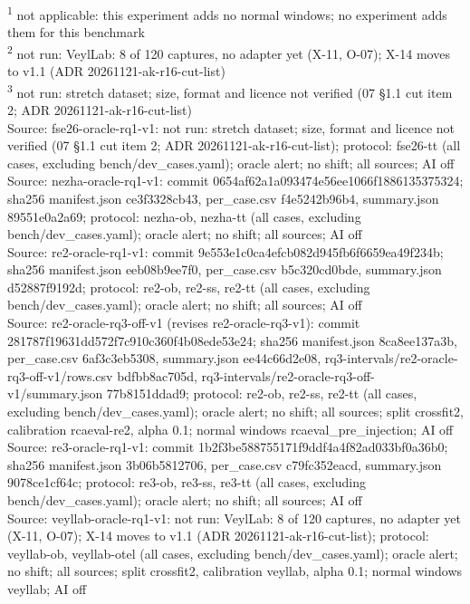 \begin{table}[t]
\begin{tabular}{llllllll}
\hline
\end{tabular}
\par\smallskip\footnotesize
\textsuperscript{1} not applicable: this experiment adds no normal windows; no experiment adds them for this benchmark\\
\textsuperscript{2} not run: VeylLab: 8 of 120 captures, no adapter yet (X-11, O-07); X-14 moves to v1.1 (ADR 20261121-ak-r16-cut-list)\\
\textsuperscript{3} not run: stretch dataset; size, format and licence not verified (07 \S{}1.1 cut item 2; ADR 20261121-ak-r16-cut-list)\\
Source: fse26-oracle-rq1-v1: not run: stretch dataset; size, format and licence not verified (07 \S{}1.1 cut item 2; ADR 20261121-ak-r16-cut-list); protocol: fse26-tt (all cases, excluding bench/dev\_cases.yaml); oracle alert; no shift; all sources; AI off\\
Source: nezha-oracle-rq1-v1: commit 0654af62a1a093474e56ee1066f1886135375324; sha256 manifest.json ce3f3328cb43, per\_case.csv f4e5242b96b4, summary.json 89551e0a2a69; protocol: nezha-ob, nezha-tt (all cases, excluding bench/dev\_cases.yaml); oracle alert; no shift; all sources; AI off\\
Source: re2-oracle-rq1-v1: commit 9e553e1c0ca4efcb082d945fb6f6659ea49f234b; sha256 manifest.json eeb08b9ee7f0, per\_case.csv b5c320cd0bde, summary.json d52887f9192d; protocol: re2-ob, re2-ss, re2-tt (all cases, excluding bench/dev\_cases.yaml); oracle alert; no shift; all sources; AI off\\
Source: re2-oracle-rq3-off-v1 (revises re2-oracle-rq3-v1): commit 281787f19631dd572f7c910c360f4b08ede53e24; sha256 manifest.json 8ca8ee137a3b, per\_case.csv 6af3c3eb5308, summary.json ee44c66d2e08, rq3-intervals/re2-oracle-rq3-off-v1/rows.csv bdfbb8ac705d, rq3-intervals/re2-oracle-rq3-off-v1/summary.json 77b8151ddad9; protocol: re2-ob, re2-ss, re2-tt (all cases, excluding bench/dev\_cases.yaml); oracle alert; no shift; all sources; split crossfit2, calibration rcaeval-re2, alpha 0.1; normal windows rcaeval\_pre\_injection; AI off\\
Source: re3-oracle-rq1-v1: commit 1b2f3be588755171f9ddf4a4f82ad033bf0a36b0; sha256 manifest.json 3b06b5812706, per\_case.csv c79fc352eacd, summary.json 9078ce1cf64c; protocol: re3-ob, re3-ss, re3-tt (all cases, excluding bench/dev\_cases.yaml); oracle alert; no shift; all sources; AI off\\
Source: veyllab-oracle-rq1-v1: not run: VeylLab: 8 of 120 captures, no adapter yet (X-11, O-07); X-14 moves to v1.1 (ADR 20261121-ak-r16-cut-list); protocol: veyllab-ob, veyllab-otel (all cases, excluding bench/dev\_cases.yaml); oracle alert; no shift; all sources; split crossfit2, calibration veyllab, alpha 0.1; normal windows veyllab; AI off\\
\end{table}
